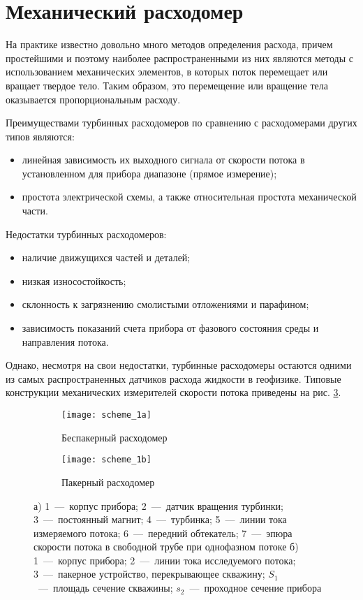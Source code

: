 \section{Механический расходомер}

На практике известно довольно много методов определения
расхода, причем простейшими и поэтому наиболее распространенными
из них являются методы с использованием механических элементов, в
которых поток перемещает или вращает твердое тело. Таким образом, это
перемещение или вращение тела оказывается пропорциональным расходу.

Преимуществами турбинных расходомеров по сравнению с расходомерами других типов являются:
\begin{itemize}
    \item линейная зависимость их выходного сигнала от скорости потока в установленном для прибора диапазоне (прямое измерение);
    \item простота электрической схемы, а также относительная простота механической части.
\end{itemize}

Недостатки турбинных расходомеров:
\begin{itemize}
    \item наличие движущихся частей и деталей;
    \item низкая износостойкость;
    \item склонность к загрязнению смолистыми отложениями и парафином;
    \item зависимость показаний счета прибора от фазового состояния среды и направления потока.
\end{itemize}

Однако, несмотря на свои недостатки,
турбинные расходомеры остаются одними из
самых распространенных датчиков расхода
жидкости в геофизике. Типовые конструкции
механических измерителей скорости потока
приведены на рис. \ref{fig:scheme_1}.

\begin{figure}[h]

\begin{subfigure}{0.5\textwidth}
\centering
\texttt{[image: scheme\_1a]} 
\caption{Беспакерный расходомер}
\label{fig:subim1}

\end{subfigure}
\begin{subfigure}{0.5\textwidth}
\centering
\texttt{[image: scheme\_1b]}
\caption{Пакерный расходомер}
\label{fig:subim2}
\end{subfigure}

\caption{
а)
1~---~корпус прибора; 2~---~датчик вращения турбинки;
3~---~постоянный магнит; 4~---~турбинка;
5~---~линии тока измеряемого потока; 6~---~передний обтекатель;
7~---~эпюра скорости потока в свободной трубе при однофазном потоке
б)
1~---~корпус прибора; 2~---~линии тока исследуемого потока;
3~---~пакерное устройство, перекрывающее скважину;
$S_1$~---~площадь сечение скважины;
$s_2$~---~проходное сечение прибора
}
\label{fig:scheme_1}

\end{figure}

